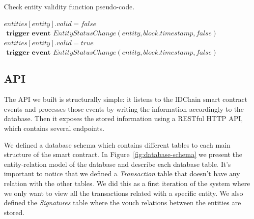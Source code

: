 \begin{algorithm}[h!]
  \caption{Check entity validity function pseudo-code.}
  \label{alg:check-entity-validity}
  \begin{algorithmic}[1]
      \State $entities[entity].valid = false$
        \State {}
      \EndFor
      \State $\textbf{ trigger event } EntityStatusChange(entity, block.timestamp, false)$
    \EndIf
    \State
      \State $entities[entity].valid = true$
        \State {}
      \EndFor
      \State $\textbf{ trigger event } EntityStatusChange(entity, block.timestamp, false)$
    \EndIf
    \EndFunction
  \end{algorithmic}
\end{algorithm}


\subsection{API}\label{subsection:api}

The API we built is structurally simple: it listens to the IDChain smart contract events and processes those events by writing the information accordingly to the database.
Then it exposes the stored information using a RESTful HTTP API, which contains several endpoints.

We defined a database schema which contains different tables to each main structure of the smart contract.
In Figure~\ref{fig:database-schema} we present the entity-relation model of the database and describe each database table.
It's important to notice that we defined a \textit{Transaction} table that doesn't have any relation with the other tables.
We did this as a first iteration of the system where we only want to view all the transactions related with a specific entity.
We also defined the \textit{Signatures} table where the vouch relations between the entities are stored.

